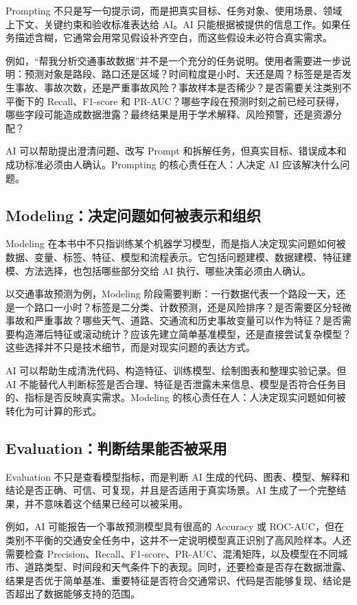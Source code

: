 Prompting 不只是写一句提示词，而是把真实目标、任务对象、使用场景、领域上下文、关键约束和验收标准表达给 AI。AI 只能根据被提供的信息工作。如果任务描述含糊，它通常会用常见假设补齐空白，而这些假设未必符合真实需求。

例如，“帮我分析交通事故数据”并不是一个充分的任务说明。使用者需要进一步说明：预测对象是路段、路口还是区域？时间粒度是小时、天还是周？标签是是否发生事故、事故次数，还是严重事故风险？事故样本是否稀少？是否需要关注类别不平衡下的 Recall、F1-score 和 PR-AUC？哪些字段在预测时刻之前已经可获得，哪些字段可能造成数据泄露？最终结果是用于学术解释、风险预警，还是资源分配？

AI 可以帮助提出澄清问题、改写 Prompt 和拆解任务，但真实目标、错误成本和成功标准必须由人确认。Prompting 的核心责任在人：人决定 AI 应该解决什么问题。

\subsection{Modeling：决定问题如何被表示和组织}

Modeling 在本书中不只指训练某个机器学习模型，而是指人决定现实问题如何被数据、变量、标签、特征、模型和流程表示。它包括问题建模、数据建模、特征建模、方法选择，也包括哪些部分交给 AI 执行、哪些决策必须由人确认。

以交通事故预测为例，Modeling 阶段需要判断：一行数据代表一个路段一天，还是一个路口一小时？标签是二分类、计数预测，还是风险排序？是否需要区分轻微事故和严重事故？哪些天气、道路、交通流和历史事故变量可以作为特征？是否需要构造滞后特征或滚动统计？应该先建立简单基准模型，还是直接尝试复杂模型？这些选择并不只是技术细节，而是对现实问题的表达方式。

AI 可以帮助生成清洗代码、构造特征、训练模型、绘制图表和整理实验记录。但 AI 不能替代人判断标签是否合理、特征是否泄露未来信息、模型是否符合任务目的、指标是否反映真实需求。Modeling 的核心责任在人：人决定现实问题如何被转化为可计算的形式。

\subsection{Evaluation：判断结果能否被采用}

Evaluation 不只是查看模型指标，而是判断 AI 生成的代码、图表、模型、解释和结论是否正确、可信、可复现，并且是否适用于真实场景。AI 生成了一个完整结果，并不意味着这个结果已经可以被采用。

例如，AI 可能报告一个事故预测模型具有很高的 Accuracy 或 ROC-AUC，但在类别不平衡的交通安全任务中，这并不一定说明模型真正识别了高风险样本。人还需要检查 Precision、Recall、F1-score、PR-AUC、混淆矩阵，以及模型在不同城市、道路类型、时间段和天气条件下的表现。同时，还要检查是否存在数据泄露、结果是否优于简单基准、重要特征是否符合交通常识、代码是否能够复现、结论是否超出了数据能够支持的范围。

